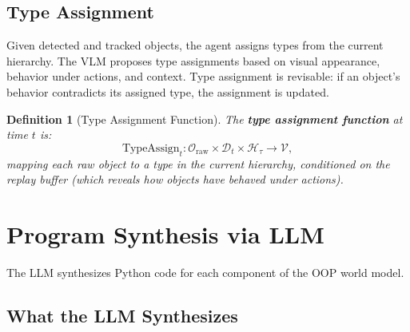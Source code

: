 \documentclass{article}
\newtheorem{definition}{Definition}
\newcommand{\calO}{\mathcal{O}}
\newcommand{\calD}{\mathcal{D}}
\newcommand{\calH}{\mathcal{H}}
\newcommand{\calV}{\mathcal{V}}
\begin{document}
\subsection{Type Assignment}
\label{sec:type_assignment}

Given detected and tracked objects, the agent assigns types from the current
hierarchy.  The VLM proposes type assignments based on visual appearance,
behavior under actions, and context.  Type assignment is revisable: if an
object's behavior contradicts its assigned type, the assignment is updated.

\begin{definition}[Type Assignment Function]
\label{def:type_assign}
The \textbf{type assignment function} at time $t$ is:
\begin{equation}
\text{TypeAssign}_t : \calO_{\text{raw}} \times \calD_t \times \calH_\tau
\to \calV,
\end{equation}
mapping each raw object to a type in the current hierarchy, conditioned on
the replay buffer (which reveals how objects have behaved under actions).
\end{definition}



\section{Program Synthesis via LLM}
\label{sec:synthesis}

The LLM synthesizes Python code for each component of the OOP world model.

\subsection{What the LLM Synthesizes}
\label{sec:what_synth}
\end{document}

